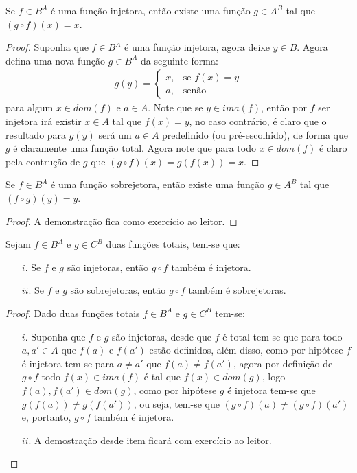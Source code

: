 \begin{teorema}\label{teo:InversaEsquerda}
	Se $f \in B^A$ é uma função injetora, então existe uma função $g \in A^B$ tal que $(g \circ f)(x) = x$.
\end{teorema}

\begin{proof}
	Suponha que $f \in B^A$ é uma função injetora, agora deixe $y \in B$. Agora defina uma nova função $g \in B^A$ da seguinte forma:
	\begin{eqnarray*}
		g(y) = \left\{\begin{array}{ll}
			x, & \text{se } f(x) = y\\
			a, & \text{senão}
		\end{array}\right.
	\end{eqnarray*}
	para algum $x \in dom(f)$ e $a \in A$. Note que se $y \in ima(f)$, então por $f$ ser injetora irá existir $x \in A$ tal que $f(x) = y$, no caso contrário, é claro que o resultado para $g(y)$ será um $a \in A$ predefinido (ou pré-escolhido), de forma que $g$ é claramente uma função total. Agora note que para todo $x \in dom(f)$ é claro pela contrução de $g$ que $(g \circ f)(x) = g(f(x)) = x$.
\end{proof}

\begin{teorema}\label{teo:InversaDireta}
	Se $f \in B^A$ é uma função sobrejetora, então existe uma função $g \in A^B$ tal que $(f \circ g)(y) = y$.
\end{teorema}

\begin{proof}
	A demonstração fica como exercício ao leitor.
\end{proof}

\begin{teorema}\label{teo:ComposicaoFuncaoPreservaTipo}
	Sejam $f \in B^A$ e $g \in C^B$ duas funções totais, tem-se que:
	\begin{itemize}
		\item[$i$.] Se $f$ e $g$ são injetoras, então $g \circ f$ também é injetora.
		\item[$ii$.] Se $f$ e $g$ são sobrejetoras, então $g \circ f$ também é sobrejetoras.
	\end{itemize}
\end{teorema}

\begin{proof}
	Dado duas funções totais $f \in B^A$ e $g \in C^B$ tem-se:
	\begin{itemize}
		\item[$i$.] Suponha que $f$ e $g$ são injetoras, desde que $f$ é total tem-se que para todo $a, a' \in A$ que $f(a)$ e $f(a')$ estão definidos, além disso, como por hipótese $f$ é injetora tem-se para $a \neq a'$ que $f(a) \neq f(a')$, agora por definição de $g \circ f$ todo $f(x) \in ima(f)$ é tal que $f(x) \in dom(g)$, logo $f(a), f(a') \in dom(g)$, como por hipótese $g$ é injetora tem-se que $g(f(a)) \neq g(f(a'))$, ou seja, tem-se que $(g \circ f)(a) \neq (g \circ f)(a')$ e, portanto, $g \circ f$ também é injetora.
		\item[$ii$.] A demostração desde item ficará com exercício ao leitor.
	\end{itemize}
\end{proof}

